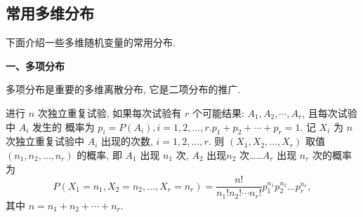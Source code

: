   \subsection{常用多维分布}\label{ssec:3.1.5}
  下面介绍一些多维随机变量的常用分布.

  \textbf{一、多项分布 }

  多项分布是重要的多维离散分布, 它是二项分布的推广.

  进行 $n$ 次独立重复试验, 如果每次试验有 $r$ 个可能结果: $A_1, A_2,\cdots,A_r$, 且每次试验中 $A_i$ 发生的
  概率为 $p_{i}=P\left(A_{i}\right), i=1,2, \ldots, r . p_{1}+p_{2}+\cdots+p_{r}=1$.
  记 $X_i$ 为 $n$ 次独立重复试验中 $A_i$ 出现的次数, $i=1,2,\ldots,r$. 则 $(X_1,X_2,\ldots,X_r)$
  取值 $(n_1,n_2,\ldots,n_r)$ 的概率, 即 $A_1$ 出现 $n_1$ 次, $A_2$ 出现$n_2$ 次\ldots\ldots $A_r$ 出现 $n_r$ 次的概率为
  \begin{equation}
	  P\left(X_{1}=n_{1}, X_{2}=n_{2}, \ldots, X_{r}=n_{r}\right)=\frac{n !}{n_{1} ! n_{2} ! \cdots n_{r} !} p_{1}^{n_{1}} p_{2}^{n_{2}} \ldots p_{r}^{n_r},
  \end{equation}
  其中 $n=n_1+n_2+\cdots+n_r$.

